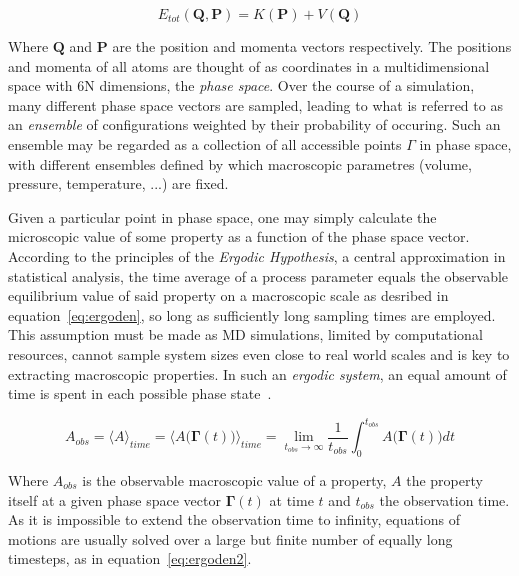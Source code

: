 \documentclass[12pt]{article}
\begin{document}
\begin{equation}
  E_{tot}(\textbf{Q}, \textbf{P}) = K(\textbf{P}) + V(\textbf{Q})
  \label{eq:total}
\end{equation}

\bigskip

\noindent Where $\textbf{Q}$ and $\textbf{P}$ are the position and momenta vectors respectively.
The positions and momenta of all atoms are thought of as coordinates in a multidimensional space with 6N dimensions, the \textit{phase space}. Over the course of a simulation, many different phase space vectors are sampled, leading to what is referred to as an \textit{ensemble} of configurations weighted by their probability of occuring. Such an ensemble may be regarded as a collection of all accessible points $\Gamma$ in phase space, with different ensembles defined by which macroscopic parametres (volume, pressure, temperature,  ...) are fixed.
\\ \par \noindent
Given a particular point in phase space, one may simply calculate the microscopic value of some property as a function of the phase space vector. According to the principles of the \textit{Ergodic Hypothesis}, a central approximation in statistical analysis, the time average of a process parameter equals the observable equilibrium value of said property on a macroscopic scale as desribed in equation~\ref{eq:ergoden}, so long as sufficiently long sampling times are employed. This assumption must be made as MD simulations, limited by computational resources, cannot sample system sizes even close to real world scales and is key to extracting macroscopic properties. In such an \textit{ergodic system}, an equal amount of time is spent in each possible phase state~\cite{Gupta1990-au}.

\begin{equation}
  A_{obs} = \langle A  \rangle_{time} = \bigl\langle A \bigl(\mathbf{\Gamma}(t)\bigr) \bigl\rangle_{time} = \lim_{t_{obs} \to \infty} \frac{1}{t_{obs}}\int_{0}^{t_{obs}}A\bigl(\mathbf{\Gamma}(t)\bigr)dt
  \label{eq:ergoden}
\end{equation}

\bigskip

\noindent Where $A_{obs}$ is the observable macroscopic value of a property, $A$ the property itself at a given phase space vector $\mathbf{\Gamma}(t)$ at time $t$ and $t_{obs}$ the observation time. As it is impossible to extend the observation time to infinity, equations of motions are usually solved over a large but finite number of equally long timesteps, as in equation~\ref{eq:ergoden2}.
\end{document}
